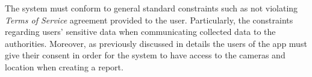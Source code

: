 The system must conform to general standard constraints such as not violating \emph{Terms of Service} agreement provided to the user. Particularly, the constraints regarding users' sensitive data when communicating collected data to the authorities. Moreover, as previously discussed in details the users of the app must give their consent in order for the system to have access to the cameras and location when creating a report.